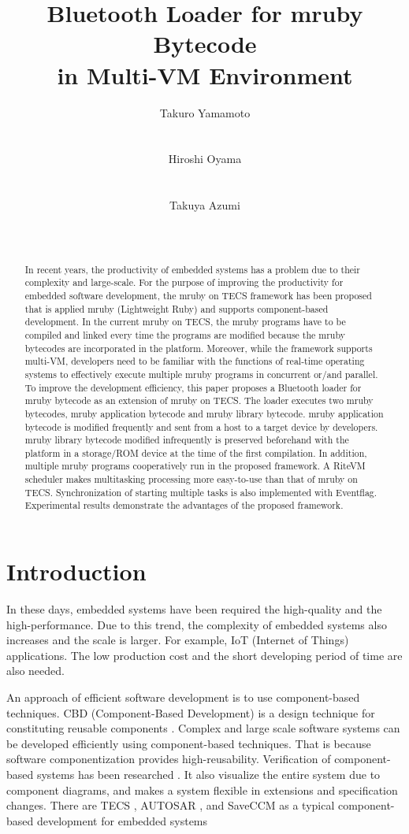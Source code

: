 \documentclass{sig-alternate-05-2015}
\title{Bluetooth Loader for mruby Bytecode \\ in Multi-VM Environment}
\author{
\alignauthor
Takuro Yamamoto\\
    \affaddr{Graduate School of Engineering Science, Osaka University}\\
    \affaddr{Osaka, JAPAN}\\
\alignauthor
Hiroshi Oyama\\
    \affaddr{OKUMA Corporation}\\
    \affaddr{Aichi, JAPAN}\\
\alignauthor
Takuya Azumi\\
    \affaddr{Graduate School of Engineering Science, Osaka University}\\
    \affaddr{Osaka, JAPAN}\\
}
\begin{document}
\maketitle
\begin{abstract}
In recent years, the productivity of embedded systems has a problem due to their complexity and large-scale.
For the purpose of improving the productivity for embedded software development, the mruby on TECS framework has been proposed that is applied mruby (Lightweight Ruby) and supports component-based development.
In the current mruby on TECS, the mruby programs have to be compiled and linked every time the programs are modified because the mruby bytecodes are incorporated in the platform.
Moreover, while the framework supports multi-VM, developers need to be familiar with the functions of real-time operating systems to effectively execute multiple mruby programs in concurrent or/and parallel.
To improve the development efficiency, this paper proposes a Bluetooth loader for mruby bytecode as an extension of mruby on TECS.
The loader executes two mruby bytecodes, mruby application bytecode and mruby library bytecode.
mruby application bytecode is modified frequently and sent from a host to a target device by developers.
mruby library bytecode modified infrequently is preserved beforehand with the platform in a storage/ROM device at the time of the first compilation.
In addition, multiple mruby programs cooperatively run in the proposed framework.
A RiteVM scheduler makes multitasking processing more easy-to-use than that of mruby on TECS.
Synchronization of starting multiple tasks is also implemented with Eventflag. 
Experimental results demonstrate the advantages of the proposed framework.
\end{abstract}

\section{Introduction}
In these days, embedded systems have been required the high-quality and the high-performance.
Due to this trend, the complexity of embedded systems also increases and the scale is larger.
For example, IoT (Internet of Things) applications.
The low production cost and the short developing period of time are also needed.

An approach of efficient software development is to use component-based techniques.
CBD (Component-Based Development) is a design technique for constituting reusable components \cite{par:Crnkovic}.
Complex and large scale software systems can be developed efficiently using component-based techniques.
That is because software componentization provides high-reusability.
Verification of component-based systems has been researched \cite{par:Blaming} \cite{par:Verification}.
It also visualize the entire system due to component diagrams, and makes a system flexible in extensions and specification changes.
There are TECS \cite{par:TECS}, AUTOSAR \cite{url:AUTOSAR}, and SaveCCM \cite{par:SAVEapproach} as a typical component-based development for embedded systems 
\end{document}

